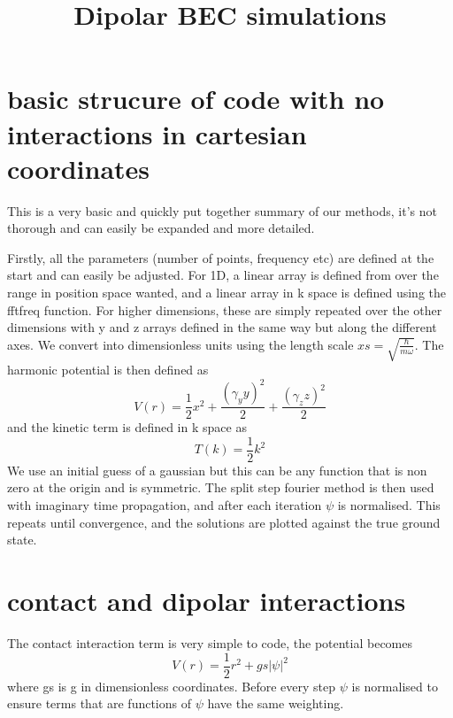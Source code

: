 \documentclass[12pt]{article}
\begin{document}
\title{Dipolar BEC simulations}
\maketitle
\section{basic strucure of code with no interactions in cartesian coordinates}
This is a very basic and quickly put together summary of our methods, it's not thorough and can easily be expanded and more detailed.

Firstly, all the parameters (number of points, frequency etc) are defined at the start and can easily be adjusted. For 1D, a linear array is defined from over the range in position space wanted, and a linear array in k space is defined using the fftfreq function. For higher dimensions, these are simply repeated over the other dimensions with y and z arrays defined in the same way but along the different axes. We convert into dimensionless units using the length scale $xs = \sqrt{\frac{\hbar}{m\omega}}$. The harmonic potential is then defined as 
\begin{equation}
V(r) = \frac{1}{2}x^{2}+\frac{(\gamma_yy)^{2}}{2}+\frac{(\gamma_zz)^{2}}{2}
\end{equation}
and the kinetic term is defined in k space as 
\begin{equation}
T(k) = \frac{1}{2}k^{2}
\end{equation} 
We use an initial guess of a gaussian but this can be any function that is non zero at the origin and is symmetric. The split step fourier method is then used with imaginary time propagation, and after each iteration $\psi$ is normalised. This repeats until convergence, and the solutions are plotted against the true ground state.
\section{contact and dipolar interactions}
The contact interaction term is very simple to code, the potential becomes 
\begin{equation}
V(r) = \frac{1}{2}r^{2}+gs|\psi|^{2}
\end{equation}
where gs is g in dimensionless coordinates. Before every step $\psi$ is normalised to ensure terms that are functions of $\psi$ have the same weighting.
 
\end{document}

